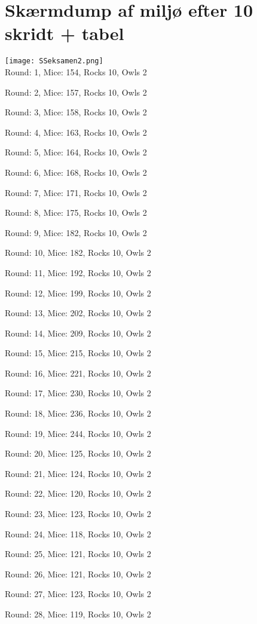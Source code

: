 \documentclass[]{article}
\begin{document}
\section{Skærmdump af miljø efter 10 skridt + tabel }

\texttt{[image: SSeksamen2.png]}\\

Round: 1, Mice: 154, Rocks 10, Owls 2

Round: 2, Mice: 157, Rocks 10, Owls 2

Round: 3, Mice: 158, Rocks 10, Owls 2

Round: 4, Mice: 163, Rocks 10, Owls 2

Round: 5, Mice: 164, Rocks 10, Owls 2

Round: 6, Mice: 168, Rocks 10, Owls 2

Round: 7, Mice: 171, Rocks 10, Owls 2

Round: 8, Mice: 175, Rocks 10, Owls 2

Round: 9, Mice: 182, Rocks 10, Owls 2

Round: 10, Mice: 182, Rocks 10, Owls 2

Round: 11, Mice: 192, Rocks 10, Owls 2

Round: 12, Mice: 199, Rocks 10, Owls 2

Round: 13, Mice: 202, Rocks 10, Owls 2

Round: 14, Mice: 209, Rocks 10, Owls 2

Round: 15, Mice: 215, Rocks 10, Owls 2

Round: 16, Mice: 221, Rocks 10, Owls 2

Round: 17, Mice: 230, Rocks 10, Owls 2

Round: 18, Mice: 236, Rocks 10, Owls 2

Round: 19, Mice: 244, Rocks 10, Owls 2

Round: 20, Mice: 125, Rocks 10, Owls 2

Round: 21, Mice: 124, Rocks 10, Owls 2

Round: 22, Mice: 120, Rocks 10, Owls 2

Round: 23, Mice: 123, Rocks 10, Owls 2

Round: 24, Mice: 118, Rocks 10, Owls 2

Round: 25, Mice: 121, Rocks 10, Owls 2

Round: 26, Mice: 121, Rocks 10, Owls 2

Round: 27, Mice: 123, Rocks 10, Owls 2

Round: 28, Mice: 119, Rocks 10, Owls 2
\end{document}
